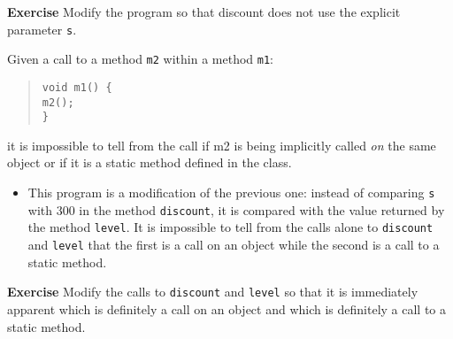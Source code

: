 \textbf{Exercise} Modify the program so that discount does not use the explicit
parameter \texttt{s}.

\bigskip


Given a call to a method \texttt{m2} within a method \texttt{m1}:
\begin{quote}
\texttt{void m1() \{}\\
\hspace*{2em}\texttt{m2();}\\
\texttt{\}}
\end{quote}
it is impossible to tell from the call if m2 is being implicitly called \emph{on}
the same object or if it is a static method defined in the class.

\begin{itemize}
	\item This program is a modification of the previous one: instead of comparing
	\texttt{s} with 300 in the method \texttt{discount}, it is compared with
	the value returned by the method \texttt{level}. It is impossible to tell
	from the calls alone to \texttt{discount} and \texttt{level} that the first is
	a call on an object while the second is a call to a static method.
\end{itemize}

\textbf{Exercise} Modify the calls to \texttt{discount} and \texttt{level}
so that it is immediately apparent which is definitely a call on an object and which
is definitely a call to a static method.
